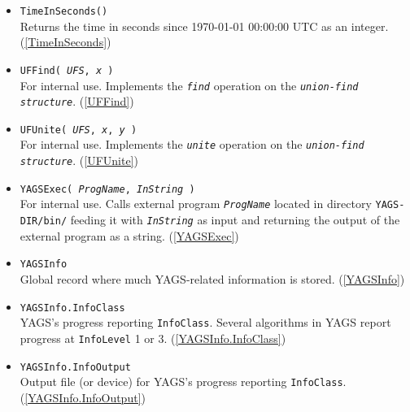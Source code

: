\documentclass[a4paper,11pt]{report}
\begin{document}
{{\begin{itemize}
 \texttt{RandomSubset( \mbox{\texttt{\mdseries\slshape Set}}, \mbox{\texttt{\mdseries\slshape k}} )}\\
 \texttt{RandomSubset( \mbox{\texttt{\mdseries\slshape Set}}, \mbox{\texttt{\mdseries\slshape p}} )}\\
 Returns a random subset of the set \mbox{\texttt{\mdseries\slshape Set}}. It also works for lists though. (\ref{RandomSubset}) 
\item \texttt{TimeInSeconds()}\\
 Returns the time in seconds since 1970-01-01 00:00:00 UTC as an integer. (\ref{TimeInSeconds}) 
\item \texttt{UFFind( \mbox{\texttt{\mdseries\slshape UFS}}, \mbox{\texttt{\mdseries\slshape x}} )}\\
 For internal use. Implements the \mbox{\texttt{\mdseries\slshape find}} operation on the \mbox{\texttt{\mdseries\slshape union-find structure}}. (\ref{UFFind}) 
\item \texttt{UFUnite( \mbox{\texttt{\mdseries\slshape UFS}}, \mbox{\texttt{\mdseries\slshape x}}, \mbox{\texttt{\mdseries\slshape y}} )}\\
 For internal use. Implements the \mbox{\texttt{\mdseries\slshape unite}} operation on the \mbox{\texttt{\mdseries\slshape union-find structure}}. (\ref{UFUnite}) 
\item \texttt{YAGSExec( \mbox{\texttt{\mdseries\slshape ProgName}}, \mbox{\texttt{\mdseries\slshape InString}} )}\\
 For internal use. Calls external program \mbox{\texttt{\mdseries\slshape ProgName}} located in directory \texttt{YAGS-DIR/bin/} feeding it with \mbox{\texttt{\mdseries\slshape InString}} as input and returning the output of the external program as a string. (\ref{YAGSExec}) 
\item \texttt{YAGSInfo}\\
 Global record where much \textsf{YAGS}-related information is stored. (\ref{YAGSInfo}) 
\item \texttt{YAGSInfo.InfoClass}\\
 \textsf{YAGS}'s progress reporting \texttt{InfoClass}. Several algorithms in \textsf{YAGS} report progress at \texttt{InfoLevel} 1 or 3. (\ref{YAGSInfo.InfoClass}) 
\item \texttt{YAGSInfo.InfoOutput}\\
 Output file (or device) for \textsf{YAGS}'s progress reporting \texttt{InfoClass}. (\ref{YAGSInfo.InfoOutput}) 
\end{itemize}
 }

}
\end{document}
